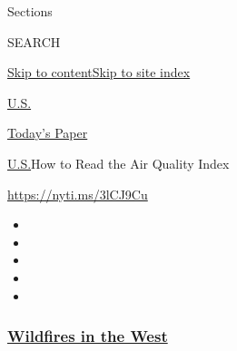 Sections

SEARCH

\protect\hyperlink{site-content}{Skip to
content}\protect\hyperlink{site-index}{Skip to site index}

\href{https://www.nytimes3xbfgragh.onion/section/us}{U.S.}

\href{https://myaccount.nytimes3xbfgragh.onion/auth/login?response_type=cookie\&client_id=vi}{}

\href{https://www.nytimes3xbfgragh.onion/section/todayspaper}{Today's
Paper}

\href{/section/us}{U.S.}\textbar{}How to Read the Air Quality Index

\url{https://nyti.ms/3lCJ9Cu}

\begin{itemize}
\item
\item
\item
\item
\item
\end{itemize}

\hypertarget{wildfires-in-the-west}{%
\subsubsection{\texorpdfstring{\href{https://www.nytimes3xbfgragh.onion/spotlight/california-wildfires?name=styln-california-wildfires\&region=TOP_BANNER\&block=storyline_menu_recirc\&action=click\&pgtype=Article\&impression_id=6dc09d40-f52b-11ea-9f60-c1748b5f940c\&variant=undefined}{Wildfires
in the West}}{Wildfires in the West}}\label{wildfires-in-the-west}}

